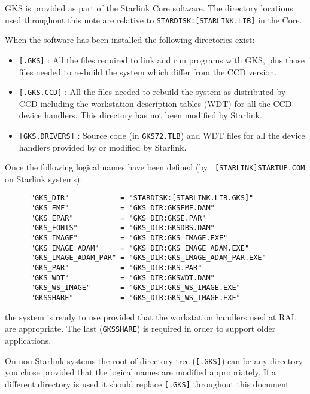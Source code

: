 GKS is provided as part of the Starlink Core software. The directory locations
used throughout this note are relative to {\tt STARDISK:[STARLINK.LIB]} in the
Core.

When the software has been installed the following directories exist:

\begin{itemize}

\item {\tt [.GKS]} :
All the files required to link and run programs with GKS, plus those files
needed to re-build the system which differ from the CCD version.

\item {\tt [.GKS.CCD]} :
All the files needed to rebuild the system as distributed by CCD including the
workstation description tables (WDT) for all the CCD device handlers.
This directory has not been modified by Starlink.

\item {\tt [GKS.DRIVERS]} :
Source code (in {\tt GKS72.TLB}) and WDT files for all the device handlers
provided by or modified by Starlink. 

\end{itemize} 

Once the following logical names have been defined (by {\tt
[STARLINK]STARTUP.COM} on Starlink systems):

\begin{verbatim}
      "GKS_DIR"            = "STARDISK:[STARLINK.LIB.GKS]"
      "GKS_EMF"            = "GKS_DIR:GKSEMF.DAM"
      "GKS_EPAR"           = "GKS_DIR:GKSE.PAR"
      "GKS_FONTS"          = "GKS_DIR:GKSDBS.DAM"
      "GKS_IMAGE"          = "GKS_DIR:GKS_IMAGE.EXE"
      "GKS_IMAGE_ADAM"     = "GKS_DIR:GKS_IMAGE_ADAM.EXE"
      "GKS_IMAGE_ADAM_PAR" = "GKS_DIR:GKS_IMAGE_ADAM_PAR.EXE"
      "GKS_PAR"            = "GKS_DIR:GKS.PAR"
      "GKS_WDT"            = "GKS_DIR:GKSWDT.DAM"
      "GKS_WS_IMAGE"       = "GKS_DIR:GKS_WS_IMAGE.EXE"
      "GKSSHARE"           = "GKS_DIR:GKS_WS_IMAGE.EXE"
\end{verbatim} 

the system is ready to use provided that the workstation handlers used at RAL
are appropriate. The last ({\tt GKSSHARE}) is required in order to support older
applications. 

On non-Starlink systems the root of directory tree ({\tt [.GKS]}) can be
any directory you chose provided that the logical names are modified
appropriately.
If a different directory is used it should replace {\tt [.GKS]} throughout
this document.

